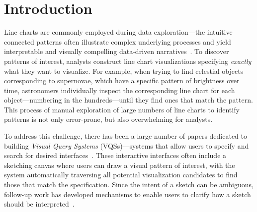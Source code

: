  \vspace{-5pt}
 \section{Introduction\label{sec:intro}}
 Line charts are commonly employed during data exploration---the intuitive connected patterns often illustrate complex underlying processes
 and yield interpretable and visually compelling data-driven narratives~\cite{Few2012}. To discover patterns of interest, analysts construct line chart visualizations   specifying {\em exactly} what they want to visualize. For example, when trying to find celestial objects corresponding to supernovae, which have a specific pattern of brightness over time, astronomers individually inspect the corresponding line chart for each object---numbering in the hundreds---until they find ones that match the pattern.  This process of manual exploration of large numbers of line charts to identify patterns is not only error-prone, but also overwhelming for analysts.
 \par To address this challenge, there has been a large number of papers dedicated to building {\em Visual Query Systems} (VQSs)---systems that allow users to specify and search for desired  interfaces~\cite{mohebbi2011google,Hochheiser2004,wattenberg2001sketching,Siddiqui2017VLDB,ryall2005querylines,correll2016semantics,Mannino2018,Eichmann2015,Holz2009}. %
 These interactive interfaces often include a sketching canvas where users can draw a visual pattern of interest, with the system automatically traversing all potential visualization candidates to find those that match the specification. Since the intent of a sketch can be ambiguous, follow-up work has developed mechanisms to enable users to clarify how a sketch should be interpreted~\cite{ryall2005querylines,correll2016semantics,Mannino2018,Eichmann2015,Holz2009}.
